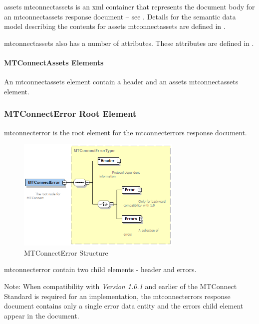 \gls{assets mtconnectassets} is an \gls{xml} container that represents the \gls{document body} for an \gls{mtconnectassets response document} -- see .  Details for the \gls{semantic data model} describing the contents for \gls{assets mtconnectassets} are defined in .

\gls{mtconnectassets} also has a number of attributes.  These attributes are defined in .

\paragraph{MTConnectAssets Elements}\mbox{}

An \gls{mtconnectassets} element \MUST contain a \gls{header} and an \gls{assets mtconnectassets} element.



\subsubsection{MTConnectError Root Element}

\gls{mtconnecterror} is the \gls{root element} for the \gls{mtconnecterrors response document}.

\begin{figure}[ht]
  \centering
  \includegraphics[width=0.7\textwidth]{figures/mtconnecterror-structure.png}
  \caption{MTConnectError Structure}
  \label{fig:mtconnecterror-structure}
\end{figure}

\FloatBarrier

\gls{mtconnecterror} \MUST contain two \glspl{child element} - \gls{header} and \gls{errors}. 

\begin{note}
Note:	When compatibility with \textit{Version 1.0.1} and earlier of the MTConnect Standard is required for an implementation, the \gls{mtconnecterrors response document} contains only a single \gls{error} \gls{data entity} and the \gls{errors} \gls{child element} \MUSTNOT appear in the document. 

\end{note}

